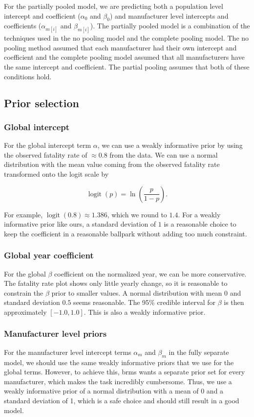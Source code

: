 \documentclass[12pt,a4paper]{article}
\begin{document}
For the partially pooled model, we are predicting both a population level intercept and coefficient ($\alpha_0$ and $\beta_0$) and manufacturer level intercepts and coefficients ($\alpha_{m[i]}$ and $\beta_{m[i]}$). The partially pooled model is a combination of the techniques used in the no pooling model and the complete pooling model. The no pooling method assumed that each manufacturer had their own intercept and coefficient and the complete pooling model assumed that all manufacturers have the same intercept and coefficient. The partial pooling assumes that both of these conditions hold.


\subsection{Prior selection}
\subsubsection*{Global intercept}
For the global intercept term $\alpha$, we can use a weakly informative prior by using the observed fatality rate of $\approx 0.8$ from the data. We can use a normal distribution with the mean value coming from the observed fatality rate transformed onto the logit scale by

$$\operatorname{logit}(p) = \ln\!\left(\frac{p}{1-p}\right).$$

For example, $\operatorname{logit}(0.8) \approx 1.386$, which we round to $1.4$. For a weakly informative prior like ours, a standard deviation of $1$ is a reasonable choice to keep the coefficient in a reasonable ballpark without adding too much constraint.

\subsubsection*{Global year coefficient}
For the global $\beta$ coefficient on the normalized year, we can be more conservative. The fatality rate plot shows only little yearly change, so it is reasonable to constrain the $\beta$ prior to smaller values. A normal distribution with mean $0$ and standard deviation $0.5$ seems reasonable. The 95\% credible interval for $\beta$ is then approximately $[-1.0, 1.0]$. This is also a weakly informative prior.

\subsubsection*{Manufacturer level priors}
For the manufacturer level intercept terms \(\alpha_m\) and \(\beta_m\) in the fully separate model, we should use the same weakly informative priors that we use for the global terms. However, to achieve this, brms wants a separate prior set for every manufacturer, which makes the task incredibly cumbersome. Thus, we use a weakly informative prior of a normal distribution with a mean of 0 and a standard deviation of 1, which is a safe choice and should still result in a good model.
\end{document}
